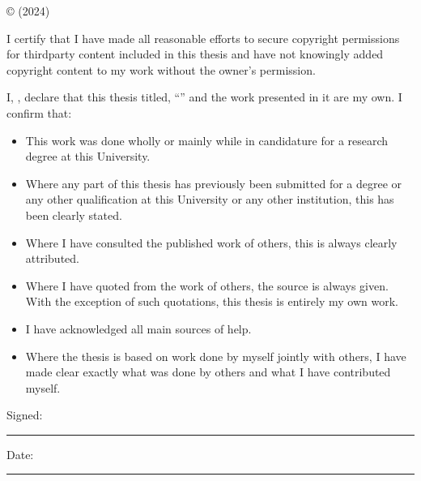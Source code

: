 \documentclass[
11pt, %
english, %
singlespacing, %
headsepline, %
]{MastersDoctoralThesis} %
\begin{document}
\begin{copyright}
	
	© \authorname  (2024)
	
	I certify that I have made all reasonable efforts to secure copyright permissions for thirdparty content included in this thesis and have not knowingly added copyright content
to my work without the owner’s permission.
	
\end{copyright}


\begin{declaration}
\addchaptertocentry{\authorshipname} %
\noindent I, \authorname, declare that this thesis titled, \enquote{\ttitle} and the work presented in it are my own. I confirm that:

\begin{itemize} 
\item This work was done wholly or mainly while in candidature for a research degree at this University.
\item Where any part of this thesis has previously been submitted for a degree or any other qualification at this University or any other institution, this has been clearly stated.
\item Where I have consulted the published work of others, this is always clearly attributed.
\item Where I have quoted from the work of others, the source is always given. With the exception of such quotations, this thesis is entirely my own work.
\item I have acknowledged all main sources of help.
\item Where the thesis is based on work done by myself jointly with others, I have made clear exactly what was done by others and what I have contributed myself.\\
\end{itemize}
 
\noindent Signed:\\
\rule[0.5em]{25em}{0.5pt} %
 
\noindent Date:\\
\rule[0.5em]{25em}{0.5pt} %
\end{declaration}
\end{document}
